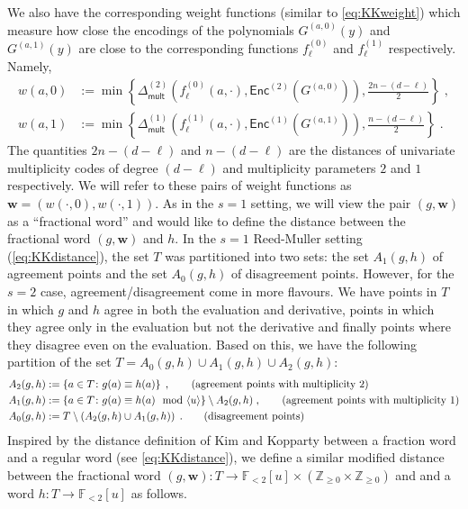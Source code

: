 \documentclass{article}
\def\Integer{\mathbb{Z}}
\def\Field{\mathbb{F}}
\let\Z\Integer
\let\F\Field
\def\vecw{\mathbf{w}}
\newcommand{\enc}{{\mathsf{Enc}}}
\newcommand{\vw}{\vecw}
\begin{document}
	We also have the corresponding weight
	functions (similar to \eqref{eq:KKweight}) which measure how close the encodings of the polynomials $G^{(a,0)}(y)$
	and $G^{(a,1)}(y)$ are close to the corresponding functions $f_\ell^{(0)}$
	and $f_\ell^{(1)}$ respectively. Namely, 
	\begin{align*}
		w(a,0) &:=
		\min\left\{{\Delta_{\mathsf{mult}}^{(2)}\left(f^{(0)}_{\ell}(a,
			\cdot) , \enc^{(2)}(G^{(a,0)}) \right)},
		{\frac{2n-(d-\ell)}{2}}  \right\}\;,\\
		w(a,1) &:=
		\min\left\{{\Delta_{\mathsf{mult}}^{(1)}\left(f^{(1)}_{\ell}(a, \cdot), \enc^{(1)}(G^{(a,1)})
			\right)}, {\frac{n-(d-\ell)}{2}}
		\right\}\;.
	\end{align*}
	The quantities $2n-(d-\ell)$ and $n-(d-\ell)$ are the distances of
	univariate multiplicity codes of degree $(d-\ell)$ and multiplicity
	parameters $2$ and $1$ respectively. 
	We will refer to these pairs of weight functions as $\vw = (w(\cdot,0),
	w(\cdot,1))$. As in the $s=1$ setting, we will view the pair
	$(g,\vw)$ as a ``fractional word'' and would like to define the distance between the fractional word $(g,\vw)$ and $h$. In the $s=1$ Reed-Muller setting (\eqref{eq:KKdistance}), the set $T$ was partitioned into two sets: the set $A_1(g,h)$ of agreement points and the set $A_0(g,h)$ of disagreement points. However, for the $s=2$ case, agreement/disagreement come in more flavours. We have points in $T$ in which $g$ and $h$ agree in both the evaluation and derivative, points in which they agree only in the evaluation but not the derivative and finally points where they disagree even on the evaluation. Based on this, we have the following partition of the set $T= A_0(g,h) \cup A_1(g,h) \cup A_2(g,h)$:
	\begin{align*}
		A_2(g,h) &:= \left\{ a \in T \colon g(a) \equiv h(a) \right\}\;,
		\tag*{\text{(agreement points with multiplicity 2)}}\\
		A_1(g,h) &:=  \left\{ a \in T \colon g(a) \equiv h(a) \mod \langle u
		\rangle \right\} \setminus A_2(g,h)\;, \tag*{\text{(agreement points with multiplicity 1)}}\\
		A_0(g,h) &:=  T \setminus \left( A_2(g,h)    \cup
		A_1(g,h)\right)\;.  \tag*{\text{(disagreement points)}}   
	\end{align*}
	Inspired by the distance definition of Kim and Kopparty between a fraction
	word and a regular word (see \eqref{eq:KKdistance}), we define a
	similar modified distance between the fractional word $(g,\vw) \colon T \to
	\F_{<2}[u] \times (\Z_{\geq 0} \times \Z_{\geq 0})$ and and a word $h \colon T \to \F_{<2}[u]$ as
	follows. 
	
\end{document}
